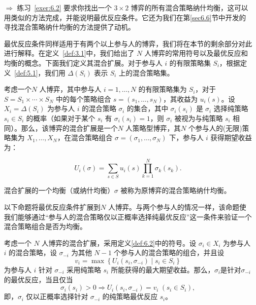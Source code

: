 \(\Rightarrow\) 练习~\ref{exer:6.2} 要求你找出一个 \(3 \times  2\) 博弈的所有混合策略纳什均衡，这可以用类似的方法完成，并能说明最优反应条件。它还为我们在第\ref{sec6.6}节中开发的寻找混合策略纳什均衡的方法提供了动机。

最优反应条件同样适用于有两个以上参与人的博弈，我们将在本节的剩余部分对此进行解释。在定义~\ref{def:3.1}中，我们给出了 \(N\) 人博弈的常用符号以及最优反应和均衡的概念。下面我们定义其混合扩展。对于参与人 \(i\) 的有限策略集 \({S}_{i}\)，根据定义~\ref{def:5.1}，我们用 \(\Delta \left( {S}_{i}\right)\) 表示 \({S}_{i}\) 上的混合策略集。

\begin{definition}[混合扩展]  \label{def:6.2}
考虑一个\(N\) 人博弈，其中参与人 \(i = 1,\ldots,N\) 的有限策略集为 \({S}_{i}\)，对于 \(S = {S}_{1} \times  \cdots  \times  {S}_{N}\) 中的每个策略组合 \(s = \left( {{s}_{1},\ldots,{s}_{N}}\right)\)，其收益为 \({u}_{i}\left( s\right)\)。设 \({X}_{i} = \Delta \left( {S}_{i}\right)\) 为参与人 \(i\) 的混合策略 \({\sigma }_{i}\) 的集合，其中 \({\sigma }_{i}\left( {s}_{i}\right)\) 是 \({\sigma }_{i}\) 选择纯策略 \({s}_{i} \in  {S}_{i}\) 的概率（如果对于某个 \({s}_{i}\) 有 \({\sigma }_{i}\left( {s}_{i}\right)  = 1\)，则 \({\sigma }_{i}\) 被视为与纯策略 \({s}_{i}\) 相同）。那么，该博弈的混合扩展是一个\(N\) 人策略型博弈，其\(N\) 个参与人的(无限)策略集为 \({X}_{1},\ldots,{X}_{N}\)，在混合策略组合 \(\sigma  = \left( {{\sigma }_{1},\ldots,{\sigma }_{N}}\right)\) 下，参与人 \(i\) 获得期望收益为：

\[
{U}_{i}\left( \sigma \right)  = \mathop{\sum }\limits_{{s \in  S}}{u}_{i}\left( s\right) \mathop{\prod }\limits_{{k = 1}}^{N}{\sigma }_{k}\left( {s}_{k}\right) .
\]

混合扩展的一个均衡（或纳什均衡）\(\sigma\) 被称为原博弈的混合策略纳什均衡。
\end{definition}

以下命题将最优反应条件扩展到\(N\) 人博弈。与两个参与人的情况一样，该命题使我们能够通过“参与人的混合策略仅以正概率选择纯最优反应”这一条件来验证一个混合策略组合是否为均衡。

\begin{proposition} \label{prop:6.3}
考虑一个 \(N\) 人博弈的混合扩展，采用定义\ref{def:6.2}中的符号。设 \({\sigma }_{i} \in  {X}_{i}\) 为参与人 \(i\) 的混合策略，设 \({\sigma }_{-i}\) 为其他 \(N - 1\) 个参与人的混合策略的组合，并且设
\[
{v}_{i} = \max \left\{  {{U}_{i}\left( {{s}_{i},{\sigma }_{-i}}\right)  \mid  {s}_{i} \in  {S}_{i}}\right\}
\]
为参与人 \(i\) 针对 \({\sigma }_{-i}\) 采用纯策略 \({s}_{i}\) 所能获得的最大期望收益。那么，\({\sigma }_{i}\)是针对\({\sigma }_{-i}\) 的最优反应，当且仅当
\[
{\sigma }_{i}\left( {s}_{i}\right)  > 0 \Rightarrow  {U}_{i}\left( {{s}_{i},{\sigma }_{-i}}\right)  = {v}_{i}\;\left( {{s}_{i} \in  {S}_{i}}\right),
\]
即，\({\sigma }_{i}\) 仅以正概率选择针对 \({\sigma }_{-i}\) 的纯策略最优反应 \({s}_{i}\)。
\end{proposition}

